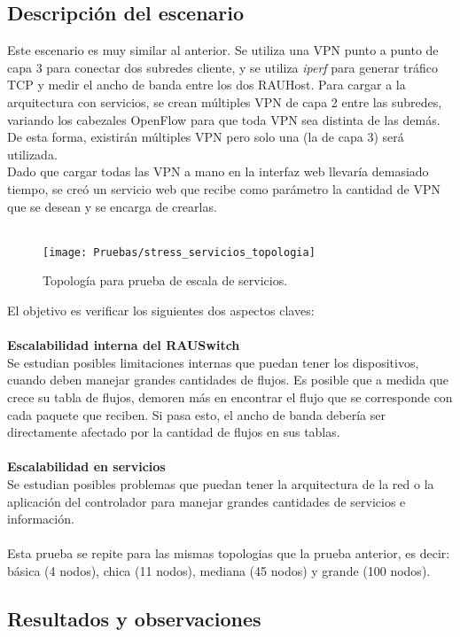 \subsection{Descripción del escenario}
Este escenario es muy similar al anterior. Se utiliza una VPN punto a punto de capa 3 para conectar dos subredes cliente, y se utiliza \textit{iperf} para generar tráfico TCP y medir el ancho de banda entre los dos RAUHost. Para cargar a la arquitectura con servicios, se crean múltiples VPN de capa 2 entre las subredes, variando los cabezales OpenFlow para que toda VPN sea distinta de las demás. De esta forma, existirán múltiples VPN pero solo una (la de capa 3) será utilizada. \\
Dado que cargar todas las VPN a mano en la interfaz web llevaría demasiado tiempo, se creó un servicio web que recibe como parámetro la cantidad de VPN que se desean y se encarga de crearlas. \\ \\
\begin{figure}[t]
	\caption{Topología para prueba de escala de servicios.}
	\texttt{[image: Pruebas/stress\_servicios\_topologia]}
	\centering
	\label{fig:stress_servicios_topologia}
\end{figure}
El objetivo es verificar los siguientes dos aspectos claves: \\ \\
\textbf{Escalabilidad interna del RAUSwitch} \\
Se estudian posibles limitaciones internas que puedan tener los dispositivos, cuando deben manejar grandes cantidades de flujos. Es posible que a medida que crece su tabla de flujos, demoren más en encontrar el flujo que se corresponde con cada paquete que reciben. Si pasa esto, el ancho de banda debería ser directamente afectado por la cantidad de flujos en sus tablas.  \\ \\
\textbf{Escalabilidad en servicios} \\
Se estudian posibles problemas que puedan tener la arquitectura de la red o la aplicación del controlador para manejar grandes cantidades de servicios e información. \\ \\
Esta prueba se repite para las mismas topologias que la prueba anterior, es decir: básica (4 nodos), chica (11 nodos), mediana (45 nodos) y grande (100 nodos).

\subsection{Resultados y observaciones}

